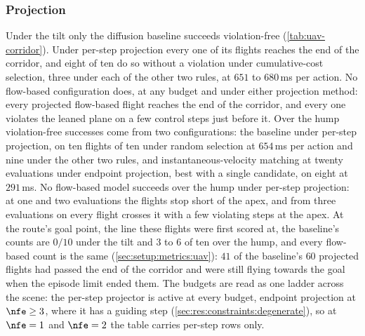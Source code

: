 \FloatBarrier
\subsubsection{Projection}\label{sec:res:uav:projected}
Under the tilt only the diffusion baseline succeeds violation-free (\autoref{tab:uav-corridor}). Under
per-step projection every one of its flights reaches the end of the corridor, and eight of ten do so
without a violation under cumulative-cost selection, three under each of the other two rules, at $651$ to
$680$\,ms per action. No flow-based configuration does, at any budget and under either projection method:
every projected flow-based flight reaches the end of the corridor, and every one violates the leaned plane
on a few control steps just before it. Over the hump violation-free successes come from two
configurations: the baseline under per-step projection, on ten flights of ten under random selection at
$654$\,ms per action and nine under the other two rules, and instantaneous-velocity matching at twenty
evaluations under endpoint projection, best with a single candidate, on eight at $291$\,ms. No flow-based
model succeeds over the hump under per-step projection: at one and two evaluations the flights stop short
of the apex, and from three evaluations on every flight crosses it with a few violating steps at the apex.
At the route's goal point, the line these flights were first scored at, the baseline's counts are $0/10$
under the tilt and $3$ to $6$ of ten over the hump, and every flow-based count is the same
(\autoref{sec:setup:metrics:uav}): $41$ of the baseline's $60$ projected flights had passed the end of the
corridor and were still flying towards the goal when the episode limit ended them. The budgets are read
as one ladder across the scene: the per-step projector is active at every budget, endpoint projection at
$\nfe\ge 3$, where it has a guiding step (\autoref{sec:res:constraints:degenerate}), so at $\nfe=1$ and
$\nfe=2$ the table carries per-step rows only.

